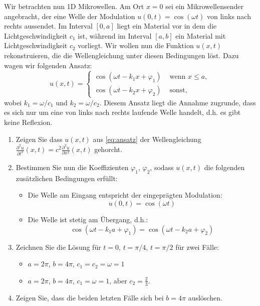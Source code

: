 \documentclass[a4paper,12pt]{article}
\begin{document}
\begin{task}{}
  Wir betrachten nun 1D Mikrowellen. Am Ort $x=0$ sei ein Mikrowellensender angebracht, der eine Welle der Modulation $u(0,t) = \cos(\omega t)$ von links nach rechts aussendet. Im Interval $[0,a]$ liegt ein Material vor in dem die Lichtgeschwindigkeit $c_1$ ist, während im Interval $[a,b]$ ein Material mit Lichtgeschwindigkeit $c_2$  vorliegt.
  Wir wollen nun die Funktion $u(x,t)$ rekonstruieren, die die Wellengleichung unter diesen Bedingungen löst. Dazu wagen wir folgenden Ansatz:
 \begin{equation} \label{eq:ansatz}
  u(x,t) = \left\{ \begin{array}{cl} \cos(\omega t - k_1 x + \varphi_1)  & \text{ wenn } x \leq a,\\
                                     \cos(\omega t - k_2 x + \varphi_2)  & \text{ sonst, }\end{array} \right.
                                    \end{equation}
                                    wobei
                                    $k_1 = \omega/c_1$ und $k_2 = \omega/c_2$.
                                    Diesem Ansatz liegt die Annahme zugrunde, dass es sich nur um eine von links nach rechts laufende Welle handelt, d.h. es gibt keine Reflexion.
\begin{enumerate}
\item Zeigen Sie dass $u(x,t)$ aus \eqref{eq:ansatz} der Wellengleichung $\frac{\partial^2 u}{\partial t^2}(x,t) = c^2 \frac{\partial^2 u}{\partial x^2}(x,t)
$ gehorcht.
\item Bestimmen Sie nun die Koeffizienten $\varphi_1$, $\varphi_2$, sodass $u(x,t)$ die folgenden zusätzlichen Bedingungen erfüllt:
  \begin{itemize}
  \item Die Welle am Eingang entspricht der eingeprägten Modulation:
    $$u(0,t) = \cos(\omega t)$$
  \item Die Welle ist stetig am Übergang, d.h.:
    $$  \cos(\omega t - k_1 a + \varphi_1) = \cos(\omega t - k_2 a + \varphi_2)$$
  \end{itemize}
\item Zeichnen Sie die Lösung für $t=0$, $t=\pi/4$, $t=\pi/2$ für zwei Fälle:
  \begin{itemize}
    \item $a = 2 \pi$, $b= 4 \pi$, $c_1 = c_2 = \omega = 1$
    \item $a = 2 \pi$, $b= 4 \pi$, $c_1 = \omega = 1$, aber $c_2 = \frac23$.
    \end{itemize}
\item Zeigen Sie, dass die beiden letzten Fälle sich bei $b=4 \pi$ auslöschen.
\end{enumerate}
\end{task}
\end{document}
